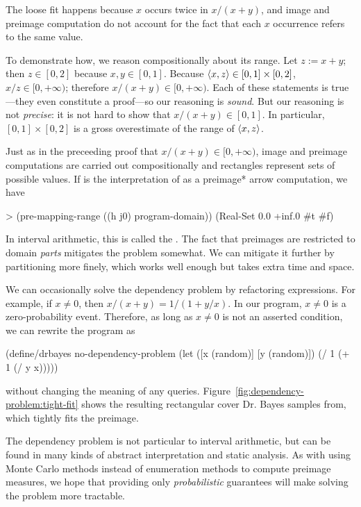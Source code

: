 The loose fit happens because $x$ occurs twice in $x{/}(x+y)$, and image and preimage computation do not account for the fact that each $x$ occurrence refers to the same value.

To demonstrate how, we reason compositionally about its range.
Let $z := x + y$; then $z \in [0,2]$ because $x,y \in [0,1]$.
Because $\langle{x,z}\rangle \in [0,1] \times [0,2]$, $x{/}z \in [0,+\infty)$; therefore $x{/}(x+y) \in [0,+\infty)$.
Each of these statements is true---they even constitute a proof---so our reasoning is \emph{sound}.
But our reasoning is not \emph{precise}: it is not hard to show that $x{/}(x+y) \in [0,1]$.
In particular, $[0,1] \times [0,2]$ is a gross overestimate of the range of $\langle{x,z}\rangle$.

Just as in the preceeding proof that $x{/}(x+y) \in [0,+\infty)$, image and preimage computations are carried out compositionally and rectangles represent sets of possible values.
If  is the interpretation of  as a preimage* arrow computation, we have
\begin{center}\singlespacing
\begin{schemedisplay}
> (pre-mapping-range ((h j0) program-domain))
(Real-Set 0.0 +inf.0 #t #f)
\end{schemedisplay}
\end{center}
In interval arithmetic, this is called the .
The fact that preimages are restricted to domain \emph{parts} mitigates the problem somewhat.
We can mitigate it further by partitioning more finely, which works well enough but takes extra time and space.

We can occasionally solve the dependency problem by refactoring expressions.
For example, if $x \neq 0$, then $x{/}(x+y) = 1{/}(1+y{/}x)$.
In our program, $x \neq 0$ is a zero-probability event.
Therefore, as long as $x \neq 0$ is not an asserted condition, we can rewrite the program as
\begin{center}\singlespacing
\begin{schemedisplay}
(define/drbayes no-dependency-problem
  (let ([x  (random)]
        [y  (random)])
    (/ 1 (+ 1 (/ y x)))))
\end{schemedisplay}
\end{center}
without changing the meaning of any queries.
Figure~\ref{fig:dependency-problem:tight-fit} shows the resulting rectangular cover Dr. Bayes samples from, which tightly fits the preimage.

The dependency problem is not particular to interval arithmetic, but can be found in many kinds of abstract interpretation and static analysis.
As with using Monte Carlo methods instead of enumeration methods to compute preimage measures, we hope that providing only \emph{probabilistic} guarantees will make solving the problem more tractable.


